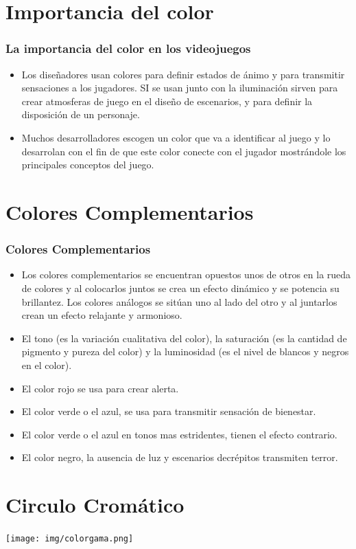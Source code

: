 \documentclass[11pt]{beamer}
\begin{document}
\section{Importancia del color}
\begin{frame}
\frametitle{La importancia del color en los videojuegos}
\begin{itemize}
\item Los diseñadores usan colores para definir estados de ánimo y para transmitir sensaciones a los jugadores. SI se usan junto con la iluminación sirven para crear atmosferas de juego en el diseño de escenarios, y para definir la disposición de un personaje.

\item Muchos desarrolladores escogen un color que va a identificar al juego y lo desarrolan con el fin de que este color conecte con el jugador mostrándole los principales conceptos del juego.
\end{itemize}
\end{frame}

\section{Colores Complementarios}
\begin{frame}
\frametitle{Colores Complementarios}
\begin{itemize}
\item Los colores complementarios se encuentran opuestos unos de otros en la rueda de colores y al colocarlos juntos se crea un efecto dinámico y se potencia su brillantez. Los colores análogos se sitúan uno al lado del otro y al juntarlos crean un efecto relajante y armonioso. 
\item El tono (es la variación cualitativa del color), la saturación (es la cantidad de pigmento y pureza del color) y la luminosidad (es el nivel de blancos y negros en el color). 
\item El color rojo se usa para crear alerta.
\item El color verde o el azul, se usa para transmitir sensación de bienestar.
\item El color verde o el azul en tonos mas estridentes, tienen el efecto contrario.
\item El color negro, la ausencia de luz y escenarios decrépitos transmiten terror.
\end{itemize}
\end{frame}

\section{Circulo Cromático}
\begin{frame}

\begin{center}
 \texttt{[image: img/colorgama.png]}
\end{center}

\end{frame}
\end{document}
